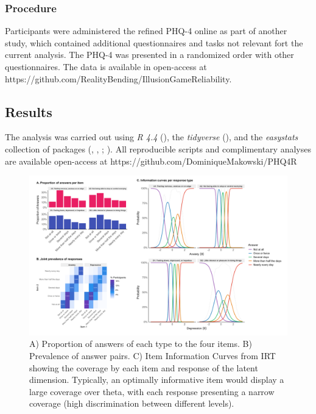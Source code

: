\documentclass[
  man,
  floatsintext,
  longtable,
  nolmodern,
  notxfonts,
  notimes,
  colorlinks=true,linkcolor=blue,citecolor=blue,urlcolor=blue]{apa7}
\begin{document}
\subsubsection{Procedure}\label{procedure}

Participants were administered the refined PHQ-4 online as part of
another study, which contained additional questionnaires and tasks not
relevant fort the current analysis. The PHQ-4 was presented in a
randomized order with other questionnaires. The data is available in
open-access at
https://github.com/RealityBending/IllusionGameReliability.

\subsection{Results}\label{results}

The analysis was carried out using \emph{R 4.4}
(), the \emph{tidyverse}
(), and the
\emph{easystats} collection of packages
(,
,
;
). All
reproducible scripts and complimentary analyses are available
open-access at https://github.com/DominiqueMakowski/PHQ4R

\begin{figure}[!htbp]

{\caption{{A) Proportion of answers of each type to the four items. B)
Prevalence of answer pairs. C) Item Information Curves from IRT showing
the coverage by each item and response of the latent dimension.
Typically, an optimally informative item would display a large coverage
over theta, with each response presenting a narrow coverage (high
discrimination between different levels).}{\label{fig-one}}}}

\includegraphics[width=1\textwidth,height=\textheight]{../../study1/figures/figure1.png}

\end{figure}
\end{document}
